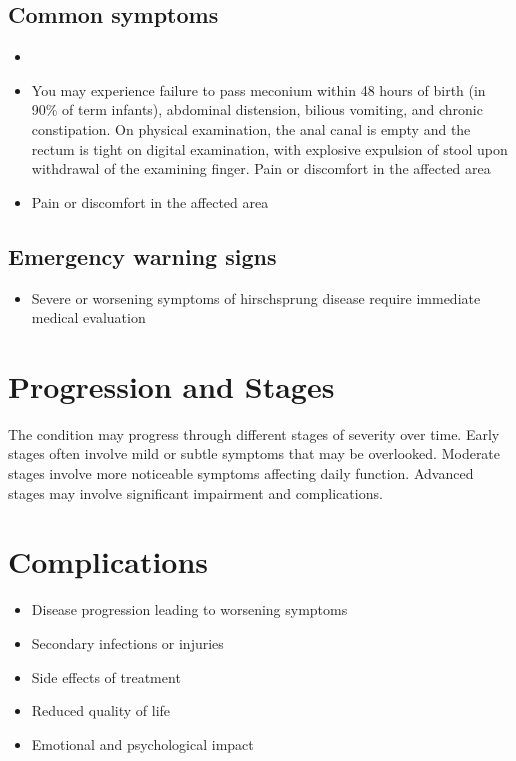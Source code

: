 \subsection{Common symptoms}
\begin{itemize}[noitemsep]
  \item \item You may experience failure to pass meconium within 48 hours of birth (in 90\% of term infants), abdominal distension, bilious vomiting, and chronic constipation. On physical examination, the anal canal is empty and the rectum is tight on digital examination, with explosive expulsion of stool upon withdrawal of the examining finger. Pain or discomfort in the affected area    \item Pain or discomfort in the affected area
  \end{itemize}

\subsection{Emergency warning signs}
\begin{itemize}[noitemsep]
  \item Severe or worsening symptoms of hirschsprung disease require immediate medical evaluation
\end{itemize}
\section{Progression and Stages}
The condition may progress through different stages of severity over time. Early stages often involve mild or subtle symptoms that may be overlooked. Moderate stages involve more noticeable symptoms affecting daily function. Advanced stages may involve significant impairment and complications.
\section{Complications}
\begin{itemize}[noitemsep]
  \item Disease progression leading to worsening symptoms
  \item Secondary infections or injuries
  \item Side effects of treatment
  \item Reduced quality of life
  \item Emotional and psychological impact
\end{itemize}

